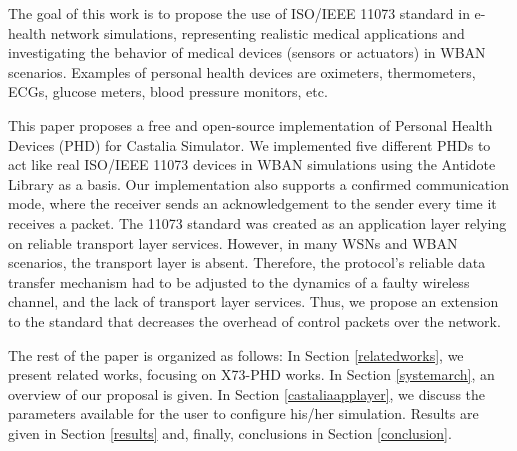 The goal of this work is to propose the use of ISO/IEEE 11073 standard in e-health network simulations, representing realistic medical applications and investigating the behavior of medical devices (sensors or actuators) in WBAN scenarios. Examples of personal health devices are oximeters, thermometers, ECGs, glucose meters, blood pressure monitors, etc. 

This paper proposes a free and open-source implementation of Personal Health Devices (PHD)  for  Castalia  Simulator.  We  implemented  five  different PHDs   to   act   like   real   ISO/IEEE   11073   devices   in   WBAN  simulations using the Antidote Library \cite{b20} as a basis.  Our  implementation also   supports   a   confirmed   communication   mode,   where the receiver  sends  an  acknowledgement  to  the  sender  every  time  it receives  a  packet. The 11073 standard was created as an application layer relying on reliable transport layer services. However, in many WSNs and WBAN scenarios, the transport layer is absent. Therefore, the protocol's reliable data transfer mechanism had to be adjusted to the dynamics of a faulty wireless channel, and the lack of transport layer services. Thus, we  propose  an  extension  to  the  standard  that  decreases  the overhead  of  control  packets  over  the  network. 

The rest of the paper is organized as follows: In Section \ref{relatedworks}, we present related works, focusing on X73-PHD works. In Section \ref{systemarch}, an overview of our proposal is given. In Section \ref{castaliaapplayer}, we discuss the parameters available for the user to configure his/her simulation. Results are given in Section \ref{results} and, finally, conclusions in Section \ref{conclusion}.
